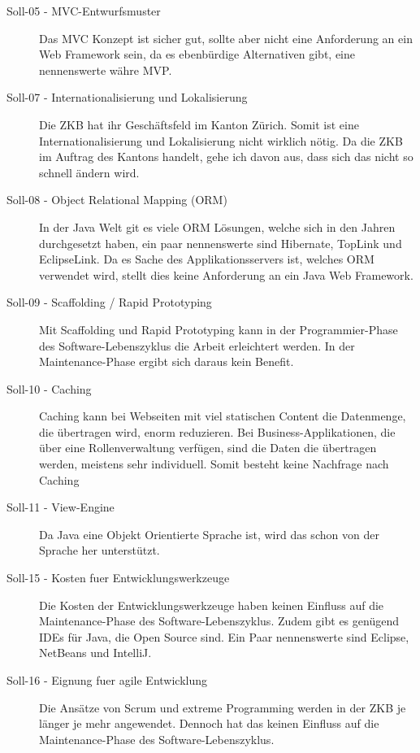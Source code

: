   \begin{description}
  \item[Soll-05 - MVC-Entwurfsmuster]
  Das \ac{MVC} Konzept ist sicher gut, sollte aber nicht eine Anforderung an ein
  Web Framework sein, da es ebenbürdige Alternativen gibt, eine nennenswerte währe
  \ac{MVP}.
  
  \item[Soll-07 - Internationalisierung und Lokalisierung]
  Die \ac{ZKB} hat ihr Geschäftsfeld im Kanton Zürich. Somit ist eine
  Internationalisierung und Lokalisierung nicht wirklich nötig. Da die \ac{ZKB}
  im Auftrag des Kantons handelt, gehe ich davon aus, dass sich das nicht so
  schnell ändern wird.
  
  \item[Soll-08 - Object Relational Mapping (ORM)]
  In der Java Welt git es viele \ac{ORM} Lösungen, welche sich in den Jahren
  durchgesetzt haben, ein paar nennenswerte sind Hibernate, TopLink und
  EclipseLink. Da es Sache des Applikationsservers ist, welches \ac{ORM}
  verwendet wird, stellt dies keine Anforderung an ein Java Web Framework.
  
  \item[Soll-09 - Scaffolding / Rapid Prototyping]
  Mit Scaffolding und Rapid Prototyping kann in der Programmier-Phase des
  Software-Lebenszyklus die Arbeit erleichtert werden. In der Maintenance-Phase
  ergibt sich daraus kein Benefit.
  
  \item[Soll-10 - Caching]
  Caching kann bei Webseiten mit viel statischen Content die Datenmenge, die
  übertragen wird, enorm reduzieren. Bei Business-Applikationen, die über eine
  Rollenverwaltung verfügen, sind die Daten die übertragen werden, meistens sehr
  individuell. Somit besteht keine Nachfrage nach Caching
  
  \item[Soll-11 - View-Engine]
  Da Java eine Objekt Orientierte Sprache ist, wird das schon von der Sprache
  her unterstützt.
  
  \item[Soll-15 - Kosten fuer Entwicklungswerkzeuge]
  Die Kosten der Entwicklungswerkzeuge haben keinen Einfluss auf die
  Maintenance-Phase des Software-Lebenszyklus. Zudem gibt es genügend \acp{IDE}
  für Java, die Open Source sind. Ein Paar nennenswerte sind Eclipse, NetBeans
  und IntelliJ.
  
  \item[Soll-16 - Eignung fuer agile Entwicklung]
  Die Ansätze von Scrum und extreme Programming werden in der \ac{ZKB} je länger
  je mehr angewendet. Dennoch hat das keinen Einfluss auf die Maintenance-Phase
  des Software-Lebenszyklus.
  
  \end{description}
  
